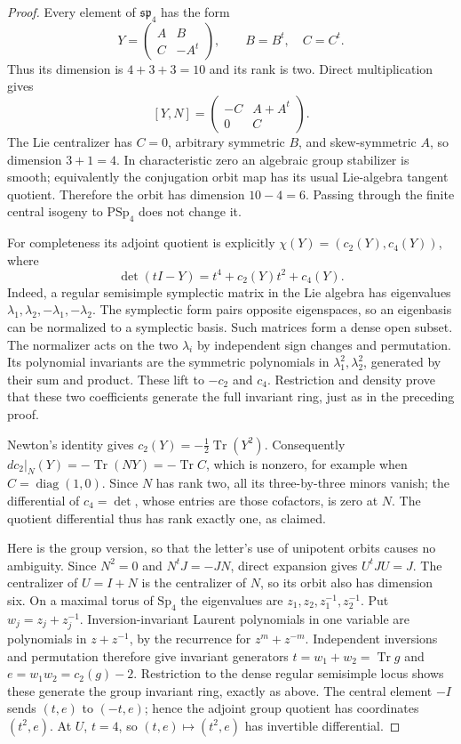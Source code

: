 \begin{proof}
Every element of \(\mathfrak{sp}_4\) has the form
\[
 Y=\begin{pmatrix}A&B\\C&-A^t\end{pmatrix},
 \qquad B=B^t,\quad C=C^t.
\]
Thus its dimension is \(4+3+3=10\) and its rank is two.
Direct multiplication gives
\[
 [Y,N]=\begin{pmatrix}-C&A+A^t\\0&C\end{pmatrix}.
\]
The Lie centralizer has \(C=0\), arbitrary symmetric
\(B\), and skew-symmetric \(A\), so dimension \(3+1=4\).
In characteristic zero an algebraic group stabilizer is
smooth; equivalently the conjugation orbit map has its
usual Lie-algebra tangent quotient. Therefore the orbit
has dimension \(10-4=6\). Passing through the finite
central isogeny to \(\mathrm{PSp}_4\) does not change it.

For completeness its adjoint quotient is explicitly
\(\chi(Y)=(c_2(Y),c_4(Y))\), where
\[
 \det(tI-Y)=t^4+c_2(Y)t^2+c_4(Y).
\]
Indeed, a regular semisimple symplectic matrix in the Lie
algebra has eigenvalues \(\lambda_1,\lambda_2,-\lambda_1,
-\lambda_2\). The symplectic form pairs opposite eigenspaces,
so an eigenbasis can be normalized to a symplectic basis.
Such matrices form a dense open subset. The normalizer
acts on the two \(\lambda_i\) by independent sign changes
and permutation. Its polynomial invariants are the
symmetric polynomials in \(\lambda_1^2,\lambda_2^2\),
generated by their sum and product. These lift to
\(-c_2\) and \(c_4\). Restriction and density prove
that these two coefficients generate the full invariant
ring, just as in the preceding proof.

Newton's identity gives \(c_2(Y)=-\tfrac12\operatorname{Tr}(Y^2)\).
Consequently \(dc_2|_N(Y)=-\operatorname{Tr}(NY)=-\operatorname{Tr}C\),
which is nonzero, for example when \(C=\operatorname{diag}(1,0)\).
Since \(N\) has rank two, all its three-by-three minors
vanish; the differential of \(c_4=\det\), whose entries
are those cofactors, is zero at \(N\). The quotient
differential thus has rank exactly one, as claimed.

Here is the group version, so that the letter's use of
unipotent orbits causes no ambiguity. Since \(N^2=0\) and
\(N^tJ=-JN\), direct expansion gives \(U^tJU=J\).
The centralizer of \(U=I+N\) is the centralizer of \(N\),
so its orbit also has dimension six. On a maximal torus
of \(\mathrm{Sp}_4\) the eigenvalues are
\(z_1,z_2,z_1^{-1},z_2^{-1}\). Put \(w_j=z_j+z_j^{-1}\).
Inversion-invariant Laurent polynomials in one variable
are polynomials in \(z+z^{-1}\), by the recurrence for
\(z^m+z^{-m}\). Independent inversions and permutation
therefore give invariant generators
\(t=w_1+w_2=\operatorname{Tr}g\) and
\(e=w_1w_2=c_2(g)-2\). Restriction to the dense regular
semisimple locus shows these generate the group invariant
ring, exactly as above. The central element \(-I\) sends
\((t,e)\) to \((-t,e)\); hence the adjoint group quotient
has coordinates \((t^2,e)\). At \(U\), \(t=4\), so
\((t,e)\mapsto(t^2,e)\) has invertible differential.


\end{proof}
